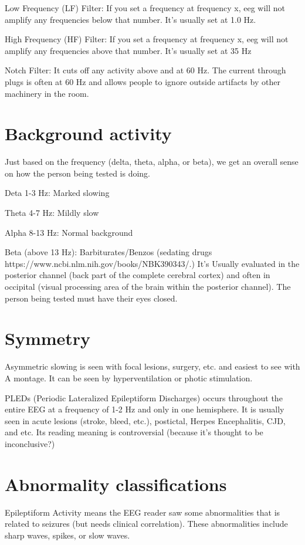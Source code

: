 \documentclass[12pt]{article}
\begin{document}
	Low Frequency (LF) Filter:  If you set a frequency at frequency x, eeg will not amplify any frequencies below that number. It's usually set at 1.0 Hz.

	High Frequency (HF) Filter: If you set a frequency at frequency x, eeg will not amplify any frequencies above that number. It's usually set at 35 Hz

	Notch Filter: It cuts off any activity above and at 60 Hz. The current through plugs is often at 60 Hz and allows people to ignore outside artifacts by other machinery in the room.
 
\section{Background activity}
Just based on the frequency (delta, theta, alpha, or beta), we get an overall sense on how the person being tested is doing.

Deta 1-3 Hz: Marked slowing

Theta 4-7 Hz: Mildly slow 

Alpha 8-13 Hz: Normal background

Beta (above 13 Hz): Barbiturates/Benzos (sedating drugs https://www.ncbi.nlm.nih.gov/books/NBK390343/.)
\medskip
	It's Usually evaluated in the posterior channel (back part of the complete cerebral cortex) and often in occipital (visual processing area of the brain within the posterior channel). The person being tested must have their eyes closed.

\section{Symmetry}

Asymmetric slowing is seen with focal lesions, surgery, etc. and easiest to see with A montage. It can be seen by hyperventilation or photic stimulation.
 
PLEDs (Periodic Lateralized Epileptiform Discharges) occurs throughout the entire EEG at a frequency of 1-2 Hz and only in one hemisphere. It is usually seen in acute lesions (stroke, bleed, etc.), postictal, Herpes Encephalitis, CJD, and etc. Its reading meaning is controversial (because it's thought to be inconclusive?)

\section{Abnormality classifications}

Epileptiform Activity means the EEG reader saw some abnormalities that is related to seizures (but needs clinical correlation). These abnormalities include sharp waves, spikes, or slow waves. 
\end{document}
